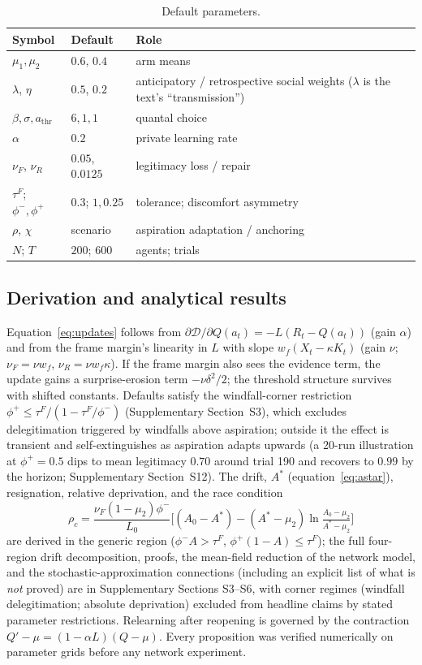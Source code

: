 \documentclass[11pt]{article}
\newcommand{\1}{\mathbf{1}}
\newcommand{\Astar}{A^{*}}
\begin{document}
\begin{table}[H]\centering\small
\caption{Default parameters.}
\label{tab:params}
\begin{tabular}{llp{7.2cm}}
\toprule
Symbol & Default & Role \\
\midrule
$\mu_1,\mu_2$ & $0.6,\,0.4$ & arm means \\
$\lambda$, $\eta$ & $0.5$, $0.2$ & anticipatory / retrospective social weights ($\lambda$ is the text's ``transmission'') \\
$\beta,\sigma,a_{\mathrm{thr}}$ & $6,1,1$ & quantal choice \\
$\alpha$ & $0.2$ & private learning rate \\
$\nu_F$, $\nu_R$ & $0.05$, $0.0125$ & legitimacy loss / repair \\
$\tau^F$; $\phi^-,\phi^+$ & $0.3$; $1,0.25$ & tolerance; discomfort asymmetry \\
$\rho$, $\chi$ & scenario & aspiration adaptation / anchoring \\
$N$; $T$ & $200$; $600$ & agents; trials \\
\bottomrule
\end{tabular}
\end{table}

\subsection{Derivation and analytical results}
Equation~\eqref{eq:updates} follows from $\partial\mathcal D/\partial Q(a_t)=-L(R_t-Q(a_t))$ (gain $\alpha$) and from the frame margin's linearity in $L$ with slope $w_f(X_t-\kappa K_t)$ (gain $\nu$; $\nu_F=\nu w_f$, $\nu_R=\nu w_f\kappa$). If the frame margin also sees the evidence term, the update gains a surprise-erosion term $-\nu\delta^2/2$; the threshold structure survives with shifted constants. Defaults satisfy the windfall-corner restriction $\phi^+\le\tau^F/(1-\tau^F/\phi^-)$ (Supplementary Section~S3), which excludes delegitimation triggered by windfalls above aspiration; outside it the effect is transient and self-extinguishes as aspiration adapts upwards (a 20-run illustration at $\phi^+=0.5$ dips to mean legitimacy $0.70$ around trial 190 and recovers to $0.99$ by the horizon; Supplementary Section~S12). The drift, $\Astar$ (equation~\eqref{eq:astar}), resignation, relative deprivation, and the race condition
\begin{equation*}
\rho_c=\frac{\nu_F(1-\mu_2)\phi^-}{L_0}\Big[(A_0-\Astar)-(\Astar-\mu_2)\ln\tfrac{A_0-\mu_2}{\Astar-\mu_2}\Big]
\end{equation*}
are derived in the generic region ($\phi^-A>\tau^F$, $\phi^+(1-A)\le\tau^F$); the full four-region drift decomposition, proofs, the mean-field reduction of the network model, and the stochastic-approximation connections (including an explicit list of what is \emph{not} proved) are in Supplementary Sections S3--S6, with corner regimes (windfall delegitimation; absolute deprivation) excluded from headline claims by stated parameter restrictions. Relearning after reopening is governed by the contraction $Q'-\mu=(1-\alpha L)(Q-\mu)$. Every proposition was verified numerically on parameter grids before any network experiment.
\end{document}

